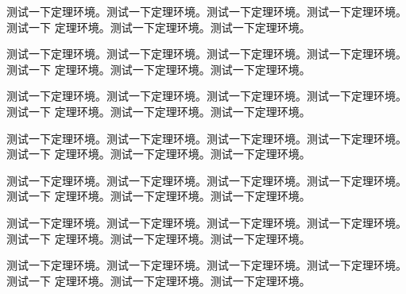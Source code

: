 \blindtext

\begin{conjecture}
    测试一下定理环境。测试一下定理环境。测试一下定理环境。测试一下定理环境。测试一下
    定理环境。测试一下定理环境。测试一下定理环境。
\end{conjecture}

\blindtext

\begin{hypothesis}
    测试一下定理环境。测试一下定理环境。测试一下定理环境。测试一下定理环境。测试一下
    定理环境。测试一下定理环境。测试一下定理环境。
\end{hypothesis}

\blindtext

\begin{axiom}
    测试一下定理环境。测试一下定理环境。测试一下定理环境。测试一下定理环境。测试一下
    定理环境。测试一下定理环境。测试一下定理环境。
\end{axiom}

\blindtext

\begin{postulate}
    测试一下定理环境。测试一下定理环境。测试一下定理环境。测试一下定理环境。测试一下
    定理环境。测试一下定理环境。测试一下定理环境。
\end{postulate}

\blindtext

\begin{principle}
    测试一下定理环境。测试一下定理环境。测试一下定理环境。测试一下定理环境。测试一下
    定理环境。测试一下定理环境。测试一下定理环境。
\end{principle}

\blindtext

\begin{problem}
    测试一下定理环境。测试一下定理环境。测试一下定理环境。测试一下定理环境。测试一下
    定理环境。测试一下定理环境。测试一下定理环境。
\end{problem}
\begin{solution}
    \blindtext
\end{solution}

\blindtext

\begin{problem}
    测试一下定理环境。测试一下定理环境。测试一下定理环境。测试一下定理环境。测试一下
    定理环境。测试一下定理环境。测试一下定理环境。
\end{problem}
\begin{solution}
    \blindtext
\end{solution}

